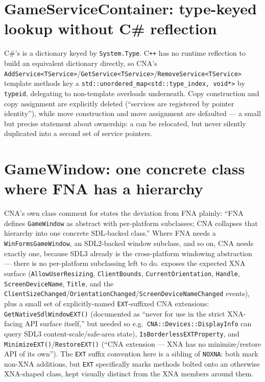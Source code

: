 \section{GameServiceContainer: type-keyed lookup without C\# reflection}

C\#'s  is a dictionary keyed by \texttt{System.Type}. C\texttt{++}
has no runtime reflection to build an equivalent dictionary directly, so CNA's
\texttt{AddService<TService>}/\texttt{GetService<TService>}/\texttt{RemoveService<TService>}
template methods key a \texttt{std::unordered\_map<std::type\_index, void*>} by
\texttt{typeid}, delegating to non-template overloads underneath. Copy construction and copy
assignment are explicitly deleted (``services are registered by pointer identity''), while
move construction and move assignment are defaulted --- a small but precise statement about
ownership: a  can be relocated, but never silently duplicated
into a second set of service pointers.

\section{GameWindow: one concrete class where FNA has a hierarchy}
\label{sec:gamewindow}

CNA's own class comment for  states the deviation from FNA plainly:
``FNA defines \texttt{GameWindow} as abstract with per-platform subclasses; CNA collapses
that hierarchy into one concrete SDL-backed class.'' Where FNA needs a
\texttt{WinFormsGameWindow}, an SDL2-backed window subclass, and so on, CNA needs exactly one,
because SDL3 already is the cross-platform windowing abstraction --- there is no per-platform
subclassing left to do.  exposes the expected XNA surface
(\texttt{AllowUserResizing}, \texttt{ClientBounds}, \texttt{CurrentOrientation},
\texttt{Handle}, \texttt{ScreenDeviceName}, \texttt{Title}, and the
\texttt{ClientSizeChanged}/\texttt{OrientationChanged}/\texttt{ScreenDeviceNameChanged}
events), plus a small set of explicitly-named \texttt{EXT}-suffixed CNA extensions:
\texttt{GetNativeSdlWindowEXT()} (documented as ``never for use in the strict XNA-facing API
surface itself,'' but needed so e.g.\ \texttt{CNA::Devices::DisplayInfo} can query SDL3
content-scale/safe-area state), \texttt{IsBorderlessEXTProperty}, and
\texttt{MinimizeEXT()}/\texttt{RestoreEXT()} (``CNA extension --- XNA has no minimize/restore
API of its own''). The \texttt{EXT} suffix convention here is a sibling of \texttt{NOXNA}: both
mark non-XNA additions, but \texttt{EXT} specifically marks methods bolted onto an otherwise
XNA-shaped class, kept visually distinct from the XNA members around them.

